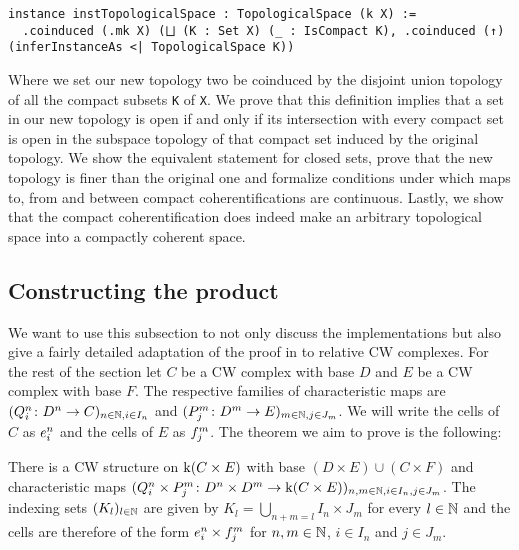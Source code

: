 \begin{lstlisting}[frame=single]
instance instTopologicalSpace : TopologicalSpace (k X) :=
  .coinduced (.mk X) (⨆ (K : Set X) (_ : IsCompact K), .coinduced (↑) (inferInstanceAs <| TopologicalSpace K))
\end{lstlisting}

Where we set our new topology two be coinduced by the disjoint union topology of all the compact subsets \lstinline|K| of \lstinline|X|. 
We prove that this definition implies that a set in our new topology is open if and only if its intersection with every compact set is open in the subspace topology of that compact set induced by the original topology. 
We show the equivalent statement for closed sets, prove that the new topology is finer than the original one and formalize conditions under which maps to, from and between compact coherentifications are continuous. 
Lastly, we show that the compact coherentification does indeed make an arbitrary topological space into a compactly coherent space. 

\subsection{Constructing the product}


We want to use this subsection to not only discuss the implementations but also give a fairly detailed adaptation of the proof in \cite{Hatcher2002} to relative CW complexes. 
For the rest of the section let $C$ be a CW complex with base $D$ and $E$ be a CW complex with base $F$.
The respective families of characteristic maps are $(Q_i^n \colon D^n \to C)_{n \in \bN, i \in I_n}$ and $(P_j^m \colon D^m \to E)_{m \in \bN, j \in J_m}$. 
We will write the cells of $C$ as $\openCell{n}{i}$ and the cells of $E$ as $\openCellf{m}{j}$.
The theorem we aim to prove is the following:

\begin{thm}\label{thm:product}
  There is a CW structure on $\kif (C \times E)$ with base $(D \times E) \cup (C \times F)$ and characteristic maps $(Q_i^n \times P_j^m \colon D^n \times D^m \to \kif(C \times E))_{n,m \in \bN,i \in I_n,j \in J_m}$.
  The indexing sets $(K_l)_{l \in \bN}$ are given by $K_l = \bigcup_{n + m = l}I_n \times J_m$ for every $l \in \bN$ and the cells are therefore of the form $\openCell{n}{i} \times \openCellf{m}{j}$ for $n, m \in \bN$, $i \in I_n$ and $j \in J_m$.
\end{thm}

